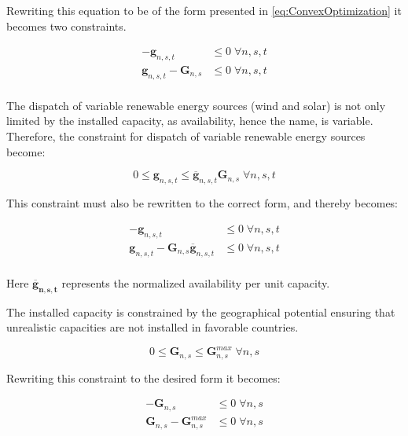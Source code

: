Rewriting this equation to be of the form presented in \ref{eq:ConvexOptimization} it becomes two constraints. 

\begin{equation}
	\begin{split}
	-\mathbf{g}_{n,s,t} & \leq 0 \; \forall n,s,t  \\
	\mathbf{g}_{n,s,t} - \mathbf{G}_{n,s} & \leq 0  \; \forall n,s,t\\
	\end{split}
\end{equation}

The dispatch of variable renewable energy sources (wind and solar) is not only limited by the installed capacity, as availability, hence the name, is variable. Therefore, the constraint for dispatch of variable renewable energy sources become:

\begin{equation}
0 \leq \mathbf{g}_{n,s,t} \leq \mathbf{\overline{g}}_{n,s,t} \mathbf{G}_{n,s} \; \forall n,s,t
\end{equation}

This constraint must also be rewritten to the correct form, and thereby becomes: 

\begin{equation}
\begin{split}
-\mathbf{g}_{n,s,t} & \leq 0 \; \forall n,s,t  \\
\mathbf{g}_{n,s,t} - \mathbf{G}_{n,s}  \mathbf{\overline{g}}_{n,s,t} & \leq 0  \; \forall n,s,t\\
\end{split}
\end{equation}

Here $\mathbf{\overline{g}_{n,s,t}}$ represents the normalized availability per unit capacity. 

The installed capacity is constrained by the geographical potential ensuring that unrealistic capacities are not installed in favorable countries. 

\begin{equation}
0 \leq \mathbf{G}_{n,s} \leq \mathbf{G}_{n,s}^{max} \; \forall n,s
\end{equation}

Rewriting this constraint to the desired form it becomes:

\begin{equation}
\begin{split}
 - \mathbf{G}_{n,s}   & \leq 0  \; \forall n,s\\
 \mathbf{G}_{n,s} -\mathbf{G}_{n,s}^{max}   & \leq 0  \; \forall n,s\\
\end{split}
\end{equation}

